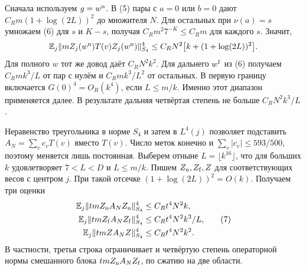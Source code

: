 \documentclass[11pt,a4paper]{article}
\newcommand{\EE}{\mathbb E}
\begin{document}
Сначала используем \(g=w^{\rm n}\). В (5) пары с \(a=0\) или \(b=0\) дают \(C_Rm(1+\log(2L))^2\) до множителя \(N\). Для остальных при \(\nu(a)=s\) умножаем (6) для \(s\) и \(K-s\), получая \(C_R m^2 7^{-K}\le C_R m\) для каждого \(s\). Значит,
\[
    \EE_j\|mZ_j(w^{\rm n})T(v)Z_j(w^{\rm n})\|_{S_4}^4
                      \le C_R N^2 \bigl[k+(1+\log(2L))^2\bigr].
\]
Для полного \(w\) тот же довод даёт \(C_R N^2 k^2\). Для дальнего \(w^{\rm f}\) из (6) получаем \(C_R m k^3/L\) от пар с нулём и \(C_R m k^3/L^2\) от остальных. В первую границу включается \(G(0)^4=O_R(k^4)\), если \(L\le m/k\). Именно этот диапазон применяется далее. В результате дальняя четвёртая степень не больше \(C_R N^2 k^3/L\).

Неравенство треугольника в норме \(S_4\) и затем в \(L^4(j)\) позволяет подставить \(A_N=\sum_v c_v T(v)\) вместо \(T(v)\). Число меток конечно и \(\sum_v|c_v|\le593/500\), поэтому меняется лишь постоянная. Выберем отныне \(L=\lfloor k^{16}\rfloor\), что для больших \(k\) удовлетворяет \(7<L<D\) и \(L\le m/k\). Пишем \(Z_{\rm n}, Z_{\rm f}, Z\) для соответствующих весов с центром \(j\). При такой отсечке \((1+\log(2L))^2=O(k)\). Получаем три оценки
\begin{equation}
 \begin{aligned}
  \EE_j\|tmZ_{\rm n} A_N Z_{\rm n}\|_{S_4}^4 &\le C_R t^4 N^2 k,\\
  \EE_j\|tmZ_{\rm f} A_N Z_{\rm f}\|_{S_4}^4 &\le C_R t^4 N^2 k^3/L,\\
  \EE_j\|tmZ A_N Z\|_{S_4}^4 &\le C_R t^4 N^2 k^2 .
 \end{aligned}                                                   \tag{7}
\end{equation}
В частности, третья строка ограничивает и четвёртую степень операторной нормы смешанного блока \(tmZ_{\rm n}A_N Z_{\rm f}\), по сжатию на две области.
\end{document}
